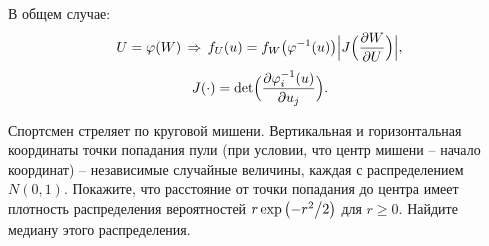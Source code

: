 \begin{ordre}
В общем случае: 
$$
U=\varphi(W) \,\Rightarrow\, f_U(u)=f_W\bigl(\varphi^{-1}(u)\bigr) \Bigl| J\Bigl( \frac{\partial W}{\partial U}\Bigr)\Bigr|,$$
$$
J(\cdot)=\det\Bigl( \frac{\partial \varphi_i^{-1}(u)}{\partial u_j}\Bigr) . 
$$
\end{ordre}


\begin{problem}
Спортсмен стреляет по круговой мишени. Вертикальная и горизонтальная 
координаты точки попадания пули (при условии, что центр мишени -- начало 
координат) -- независимые случайные величины, каждая с распределением 
$N(0,1)$. Покажите, что расстояние от точки попадания до центра имеет 
плотность распределения вероятностей $r\exp \left( {-{r^2} \mathord{\left/ 
{\vphantom {{r^2} 2}} \right. \kern-\nulldelimiterspace} 2} \right)$ для 
$r\ge 0$. Найдите медиану этого распределения.
\end{problem}